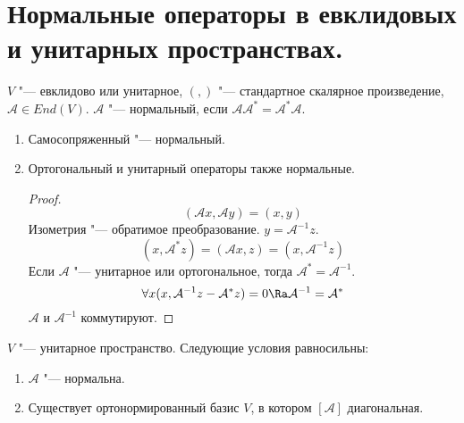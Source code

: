 \section{Нормальные операторы в евклидовых и унитарных пространствах.}

\begin{Def}
	$V$ "--- евклидово или унитарное, $(,)$ "--- стандартное скалярное произведение, $\mathcal A \in End(V)$.
	$\mathcal A$ "--- нормальный, если $\mathcal A \mathcal{A}^* = \mathcal{A}^*\mathcal A$.
\end{Def}

\begin{exmp}
	\begin{enumerate}
		\item Самосопряженный "--- нормальный.
		\item Ортогональный и унитарный операторы также нормальные.
		\begin{proof}
			\[ (\mathcal Ax, \mathcal Ay) = (x, y) \]
			Изометрия "--- обратимое преобразование.
			$y = \mathcal{A}^{-1}z$.
			\[ (x, \mathcal{A}^*z) = (\mathcal Ax, z) = (x, \mathcal{A}^{-1}z) \]
			Если $\mathcal A$ "--- унитарное или ортогональное, тогда $\mathcal{A}^* = \mathcal{A}^{-1}$.
			\[ \forall x (x, \mathcal{A}^{-1}z - \mathcal{A}^*z) = 0 \Ra \mathcal{A}^{-1} = \mathcal{A}^* \]
			$\mathcal A$ и $\mathcal{A}^{-1}$ коммутируют.
		\end{proof}
	\end{enumerate}
\end{exmp}

\begin{theorem}
	$V$ "--- унитарное пространство.
	Следующие условия равносильны:
	\begin{enumerate}
		\item $\mathcal A$ "--- нормальна.
		\item Существует ортонормированный базис $V$, в котором $[\mathcal A]$ диагональная.
	\end{enumerate}
\end{theorem}

